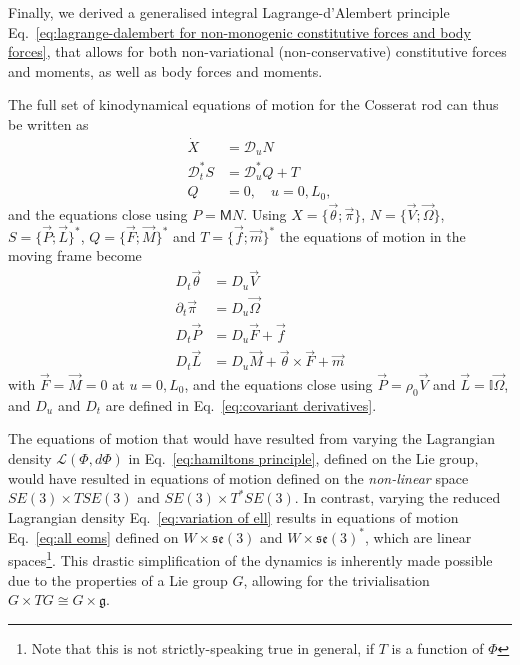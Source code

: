 Finally, we derived a generalised integral Lagrange-d'Alembert principle Eq.~\ref{eq:lagrange-dalembert for non-monogenic constitutive forces and body forces}, that allows for both non-variational (non-conservative) constitutive forces and moments, as well as body forces and moments.

The full set of kinodynamical equations of motion for the Cosserat rod can thus be written as
\begin{subequations} \label{eq:all eoms}
\begin{align}
\dot{X} & = \mathcal{D}_u N \\
\mathcal{D}^*_t S & = \mathcal{D}^*_u Q + T \\
Q & = 0, \quad u = 0, L_0, 
\end{align}
\end{subequations}
and the equations close using $P = \mathsf{M} N$. Using $X = \{ \vec{\theta} ; \vec{\pi} \}$, $N = \{ \vec{V} ; \vec{\Omega} \}$, $S = \{ \vec{P} ; \vec{L} \}^*$, $Q = \{ \vec{F} ; \vec{M} \}^*$ and $T = \{ \vec{f} ; \vec{m} \}^*$ the equations of motion in the moving frame become
\begin{subequations} \label{eq:submatrix kinodynamic eoms for cosserat rod}
\begin{align}
D_t \vec{\theta} & = D_u \vec{V} \\
\partial_t \vec{\pi} & = D_u \vec{\Omega} \\
D_t \vec{P} & = D_u \vec{F} + \vec{f} \\
D_t \vec{L} & = D_u \vec{M} + \vec{\theta} \times \vec{F} + \vec{m} 
\end{align}
\end{subequations}
with $\vec{F} = \vec{M} = 0$ at $u = 0, L_0$, and the equations close using $\vec{P} = \rho_0 \vec{V}$ and $\vec{L} = \mathbb{I} \vec{\Omega}$, and $D_u$ and $D_t$ are defined in Eq.~\ref{eq:covariant derivatives}.

The equations of motion that would have resulted from varying the Lagrangian density $\mathcal{L}(\Phi, d \Phi)$ in Eq.~\ref{eq:hamiltons principle}, defined on the Lie group, would have resulted in equations of motion defined on the \textit{non-linear} space $SE(3) \times TSE(3)$ and $SE(3) \times T^*SE(3)$. In contrast, varying the reduced Lagrangian density Eq.~\ref{eq:variation of ell} results in equations of motion Eq.~\ref{eq:all eoms} defined on $W \times \mathfrak{se}(3)$ and $W \times \mathfrak{se}(3)^*$, which are linear spaces\footnote{Note that this is not strictly-speaking true in general, if $T$ is a function of $\Phi$}. This drastic simplification of the dynamics is inherently made possible due to the properties of a Lie group $G$, allowing for the trivialisation $G \times TG \cong G \times \mathfrak{g}$.

